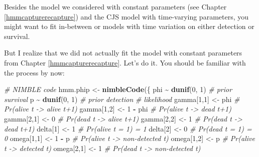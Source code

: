 \documentclass[
  12pt,
]{krantz}
\newenvironment{Shaded}{\begin{snugshade}}{\end{snugshade}}
\newcommand{\CommentTok}[1]{\textcolor[rgb]{0.56,0.35,0.01}{\textit{#1}}}
\newcommand{\DecValTok}[1]{\textcolor[rgb]{0.00,0.00,0.81}{#1}}
\newcommand{\FunctionTok}[1]{\textcolor[rgb]{0.13,0.29,0.53}{\textbf{#1}}}
\newcommand{\NormalTok}[1]{#1}
\newcommand{\OtherTok}[1]{\textcolor[rgb]{0.56,0.35,0.01}{#1}}
\newcommand{\SpecialCharTok}[1]{\textcolor[rgb]{0.81,0.36,0.00}{\textbf{#1}}}
\begin{document}
Besides the model we considered with constant parameters (see Chapter \ref{hmmcapturerecapture}) and the CJS model with time-varying parameters, you might want to fit in-between or models with time variation on either detection or survival.

But I realize that we did not actually fit the model with constant parameters from Chapter \ref{hmmcapturerecapture}. Let's do it. You should be familiar with the process by now:

\begin{Shaded}
\begin{Highlighting}[]
\CommentTok{\# NIMBLE code }
\NormalTok{hmm.phip }\OtherTok{\textless{}{-}} \FunctionTok{nimbleCode}\NormalTok{(\{}
\NormalTok{  phi }\SpecialCharTok{\textasciitilde{}} \FunctionTok{dunif}\NormalTok{(}\DecValTok{0}\NormalTok{, }\DecValTok{1}\NormalTok{) }\CommentTok{\# prior survival}
\NormalTok{  p }\SpecialCharTok{\textasciitilde{}} \FunctionTok{dunif}\NormalTok{(}\DecValTok{0}\NormalTok{, }\DecValTok{1}\NormalTok{) }\CommentTok{\# prior detection}
  \CommentTok{\# likelihood}
\NormalTok{  gamma[}\DecValTok{1}\NormalTok{,}\DecValTok{1}\NormalTok{] }\OtherTok{\textless{}{-}}\NormalTok{ phi      }\CommentTok{\# Pr(alive t {-}\textgreater{} alive t+1)}
\NormalTok{  gamma[}\DecValTok{1}\NormalTok{,}\DecValTok{2}\NormalTok{] }\OtherTok{\textless{}{-}} \DecValTok{1} \SpecialCharTok{{-}}\NormalTok{ phi  }\CommentTok{\# Pr(alive t {-}\textgreater{} dead t+1)}
\NormalTok{  gamma[}\DecValTok{2}\NormalTok{,}\DecValTok{1}\NormalTok{] }\OtherTok{\textless{}{-}} \DecValTok{0}        \CommentTok{\# Pr(dead t {-}\textgreater{} alive t+1)}
\NormalTok{  gamma[}\DecValTok{2}\NormalTok{,}\DecValTok{2}\NormalTok{] }\OtherTok{\textless{}{-}} \DecValTok{1}        \CommentTok{\# Pr(dead t {-}\textgreater{} dead t+1)}
\NormalTok{  delta[}\DecValTok{1}\NormalTok{] }\OtherTok{\textless{}{-}} \DecValTok{1}          \CommentTok{\# Pr(alive t = 1) = 1}
\NormalTok{  delta[}\DecValTok{2}\NormalTok{] }\OtherTok{\textless{}{-}} \DecValTok{0}          \CommentTok{\# Pr(dead t = 1) = 0}
\NormalTok{  omega[}\DecValTok{1}\NormalTok{,}\DecValTok{1}\NormalTok{] }\OtherTok{\textless{}{-}} \DecValTok{1} \SpecialCharTok{{-}}\NormalTok{ p    }\CommentTok{\# Pr(alive t {-}\textgreater{} non{-}detected t)}
\NormalTok{  omega[}\DecValTok{1}\NormalTok{,}\DecValTok{2}\NormalTok{] }\OtherTok{\textless{}{-}}\NormalTok{ p        }\CommentTok{\# Pr(alive t {-}\textgreater{} detected t)}
\NormalTok{  omega[}\DecValTok{2}\NormalTok{,}\DecValTok{1}\NormalTok{] }\OtherTok{\textless{}{-}} \DecValTok{1}        \CommentTok{\# Pr(dead t {-}\textgreater{} non{-}detected t)}

\end{Highlighting}
\end{Shaded}
\end{document}
